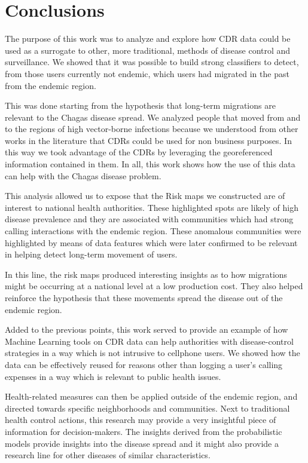 \chapter{Conclusions}\label{ch:conclusions}

The purpose of this work was to analyze and explore how CDR data could be used as a surrogate to other, more traditional, methods of disease control and surveillance.
We showed that it was possible to build strong classifiers to detect, from those users currently not endemic, which users had migrated in the past from the endemic region.

This was done starting from the hypothesis that long-term migrations are relevant to the Chagas disease spread.
We analyzed people that moved from and to the regions of high vector-borne infections because we understood from other works in the literature that CDRs could be used for non business purposes.
In this way we took advantage of the CDRs by leveraging the georeferenced information contained in them.
In all, this work shows how the use of this data can help with the Chagas disease problem.


This analysis allowed us to expose that the Risk maps we constructed are of interest to national health authorities.
These highlighted spots are likely of high disease prevalence and they are associated with communities which had strong calling interactions with the endemic region.
These anomalous communities were highlighted by means of data features which were later confirmed to be relevant in helping detect long-term movement of users.


In this line, the risk maps produced interesting insights as to how migrations might be occurring at a national level at a low production cost.
They also helped reinforce the hypothesis that these movements spread the disease out of the endemic region.


Added to the previous points, this work served to provide an example of how Machine Learning tools on CDR data can help authorities with disease-control strategies in a way which is not intrusive to cellphone users.
We showed how the data can be effectively reused for reasons other than logging a user's calling expenses in a way which is relevant to public health issues.

Health-related measures can then be applied outside of the endemic region, and directed towards specific neighborhoods and communities.
Next to traditional health control actions, this research may provide a very insightful piece of information for decision-makers.
The insights derived from the probabilistic models provide insights into the disease spread and it might also provide a research line for  other diseases of similar characteristics.

